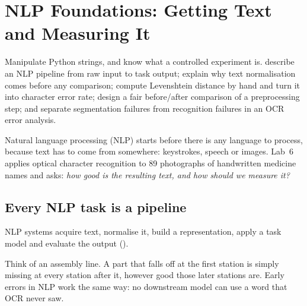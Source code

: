 \chapter{NLP Foundations: Getting Text and Measuring It}
\label{ch:nlp-foundations}

\chapterguide%
  {Manipulate Python strings, and know what a controlled experiment is.}
  {describe an NLP pipeline from raw input to task output; explain why text normalisation comes before any comparison; compute Levenshtein distance by hand and turn it into character error rate; design a fair before/after comparison of a preprocessing step; and separate segmentation failures from recognition failures in an OCR error analysis.}

Natural language processing (NLP) starts before there is any language to process, because text has to come from somewhere: keystrokes, speech or images. Lab~6 applies optical character recognition to 89 photographs of handwritten medicine names and asks: \emph{how good is the resulting text, and how should we measure it?}

\section{Every NLP task is a pipeline}

NLP systems acquire text, normalise it, build a representation, apply a task model and evaluate the output ().

\begin{analogy}
Think of an assembly line. A part that falls off at the first station is simply missing at every station after it, however good those later stations are. Early errors in NLP work the same way: no downstream model can use a word that OCR never saw.
\end{analogy}

